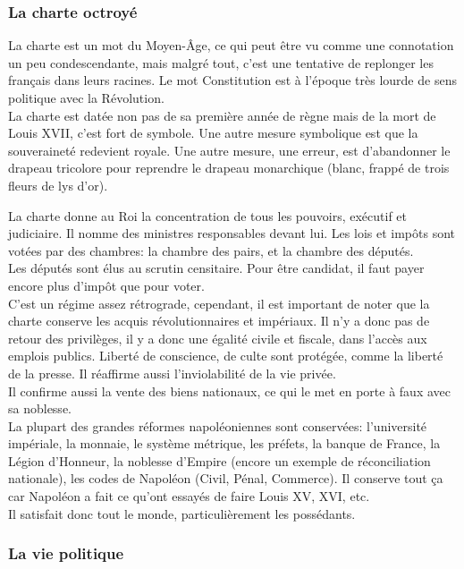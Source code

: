 \documentclass[10pt, a4paper, openany]{book}
\begin{document}
\subsubsection{La charte octroyé}

La charte est un mot du Moyen-Âge, ce qui peut être vu comme une connotation un peu condescendante, mais malgré tout, c'est une tentative de replonger les français dans leurs racines. Le mot Constitution est à l'époque très lourde de sens politique avec la Révolution. \\
La charte est datée non pas de sa première année de règne mais de la mort de Louis XVII, c'est fort de symbole. Une autre mesure symbolique est que la souveraineté redevient royale. Une autre mesure, une erreur, est d'abandonner le drapeau tricolore pour reprendre le drapeau monarchique (blanc, frappé de trois fleurs de lys d'or). 


La charte donne au Roi la concentration de tous les pouvoirs, exécutif et judiciaire. Il nomme des ministres responsables devant lui. Les lois et impôts sont votées par des chambres: la chambre des pairs, et la chambre des députés. \\
Les députés sont élus au scrutin censitaire. Pour être candidat, il faut payer encore plus d'impôt que pour voter. \\
C'est un régime assez rétrograde, cependant, il est important de noter que la charte conserve les acquis révolutionnaires et impériaux. Il n'y a donc pas de retour des privilèges, il y a donc une égalité civile et fiscale, dans l'accès aux emplois publics. Liberté de conscience, de culte sont protégée, comme la liberté de la presse. Il réaffirme aussi l'inviolabilité de la vie privée. \\
Il confirme aussi la vente des biens nationaux, ce qui le met en porte à faux avec sa noblesse. \\
La plupart des grandes réformes napoléoniennes sont conservées: l'université impériale, la monnaie, le système métrique, les préfets, la banque de France, la Légion d'Honneur, la noblesse d'Empire (encore un exemple de réconciliation nationale), les codes de Napoléon (Civil, Pénal, Commerce). Il conserve tout ça car Napoléon a fait ce qu'ont essayés de faire Louis XV, XVI, etc. \\
Il satisfait donc tout le monde, particulièrement les possédants. 

\subsubsection{La vie politique}
\end{document}
